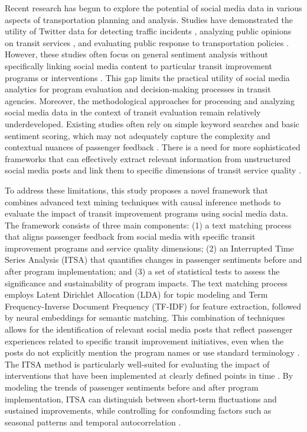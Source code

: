 \documentclass[a4paper,fleqn,12pt]{cas-sc}
\begin{document}
Recent research has begun to explore the potential of social media data in various aspects of transportation planning and analysis. Studies have demonstrated the utility of Twitter data for detecting traffic incidents \citep{fu2015social}, analyzing public opinions on transit services \citep{luong2015public, collins2013novel}, and evaluating public response to transportation policies \citep{chakraborty2019public}. However, these studies often focus on general sentiment analysis without specifically linking social media content to particular transit improvement programs or interventions \citep{ali2017fuzzy, ingvardson2019relationship}. This gap limits the practical utility of social media analytics for program evaluation and decision-making processes in transit agencies. Moreover, the methodological approaches for processing and analyzing social media data in the context of transit evaluation remain relatively underdeveloped. Existing studies often rely on simple keyword searches and basic sentiment scoring, which may not adequately capture the complexity and contextual nuances of passenger feedback \citep{houston2015public, kamga2023utilizing}. There is a need for more sophisticated frameworks that can effectively extract relevant information from unstructured social media posts and link them to specific dimensions of transit service quality \citep{haghighi2018using}.

To address these limitations, this study proposes a novel framework that combines advanced text mining techniques with causal inference methods to evaluate the impact of transit improvement programs using social media data. The framework consists of three main components: (1) a text matching process that aligns passenger feedback from social media with specific transit improvement programs and service quality dimensions; (2) an Interrupted Time Series Analysis (ITSA) that quantifies changes in passenger sentiments before and after program implementation; and (3) a set of statistical tests to assess the significance and sustainability of program impacts. The text matching process employs Latent Dirichlet Allocation (LDA) for topic modeling and Term Frequency-Inverse Document Frequency (TF-IDF) for feature extraction, followed by neural embeddings for semantic matching. This combination of techniques allows for the identification of relevant social media posts that reflect passenger experiences related to specific transit improvement initiatives, even when the posts do not explicitly mention the program names or use standard terminology \citep{blei2003latent, lopez2016interrupted}. The ITSA method is particularly well-suited for evaluating the impact of interventions that have been implemented at clearly defined points in time \citep{wagner2002segmented, lopez2016interrupted}. By modeling the trends of passenger sentiments before and after program implementation, ITSA can distinguish between short-term fluctuations and sustained improvements, while controlling for confounding factors such as seasonal patterns and temporal autocorrelation \citep{schaffer2021interrupted, koppel2023disentangling}.
\end{document}
